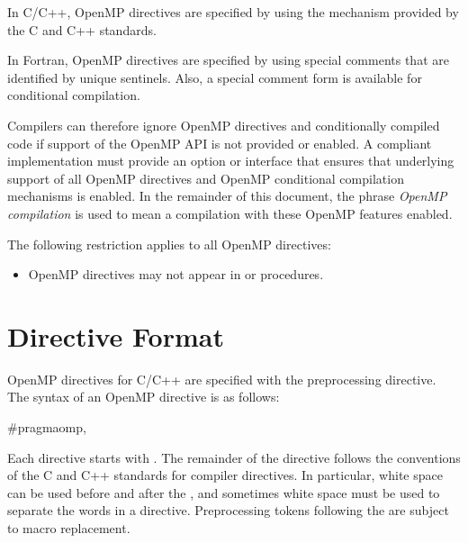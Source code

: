 \ccppspecificstart
In C/C++, OpenMP directives are specified by using the  mechanism provided 
by the C and C++ standards. 
\ccppspecificend

\fortranspecificstart
In Fortran, OpenMP directives are specified by using special comments that are 
identified by unique sentinels. Also, a special comment form is available for conditional 
compilation. 
\fortranspecificend

Compilers can therefore ignore OpenMP directives and conditionally compiled code if 
support of the OpenMP API is not provided or enabled. A compliant implementation 
must provide an option or interface that ensures that underlying support of all OpenMP 
directives and OpenMP conditional compilation mechanisms is enabled. In the 
remainder of this document, the phrase \emph{OpenMP compilation} is used to mean a 
compilation with these OpenMP features enabled.

\begin{samepage}
\fortranspecificstart
\restrictions
The following restriction applies to all OpenMP directives: 
\begin{itemize}
\item OpenMP directives may not appear in  or  procedures.
\end{itemize}
\fortranspecificend
\end{samepage}








\section{Directive Format}
\label{sec:Directive Format}
\ccppspecificstart
OpenMP directives for C/C++ are specified with the  preprocessing directive. 
The syntax of an OpenMP directive is as follows:

\begin{boxedcode}
\#pragma\plc{ }omp\plc{ directive-name [clause[ [},\plc{] clause] ... ] new-line}
\end{boxedcode}

Each directive  starts with  . The remainder of the directive follows the 
conventions of the C and C++ standards for compiler directives. In particular, white 
space can be used before and after the \code{\#}, and sometimes white space must be used to 
separate the words in a directive. Preprocessing tokens following the  
are subject to macro replacement. 

